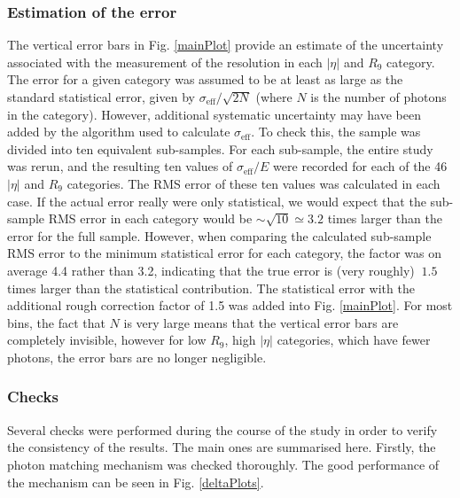 \documentclass[10pt]{article}
\begin{document}
\subsubsection{Estimation of the error}
The vertical error bars in Fig. \ref{mainPlot} provide an estimate of the uncertainty associated with the measurement of the resolution in each $|\eta|$ and $R_9$ category. The error for a given category was assumed to be at least as large as the standard statistical error, given by $\sigma_{\text{eff}}/\sqrt{2N}$ (where $N$ is the number of photons in the category). However, additional systematic uncertainty may have been added by the algorithm used to calculate $\sigma_{\text{eff}}$. To check this, the sample was divided into ten equivalent sub-samples. For each sub-sample, the entire study was rerun, and the resulting ten values of $\sigma_{\text{eff}}/E$ were recorded for each of the 46 $|\eta|$ and $R_9$ categories. The RMS error of these ten values was calculated in each case. If the actual error really were only statistical, we would expect that the sub-sample RMS error in each category would be $\sim \sqrt{10} \simeq 3.2$ times larger than the error for the full sample. However, when comparing the calculated sub-sample RMS error to the minimum statistical error for each category, the factor was on average 4.4 rather than 3.2, indicating that the true error is (very roughly) $~1.5$ times larger than the statistical contribution. The statistical error with the additional rough correction factor of 1.5 was added into Fig. \ref{mainPlot}. For most bins, the fact that $N$ is very large means that the vertical error bars are completely invisible, however for low $R_9$, high $|\eta|$ categories, which have fewer photons, the error bars are no longer negligible.

\subsubsection{Checks}

Several checks were performed during the course of the study in order to verify the consistency of the results. The main ones are summarised here. Firstly, the photon matching mechanism was checked thoroughly. The good performance of the mechanism can be seen in Fig. \ref{deltaPlots}.
\end{document}
